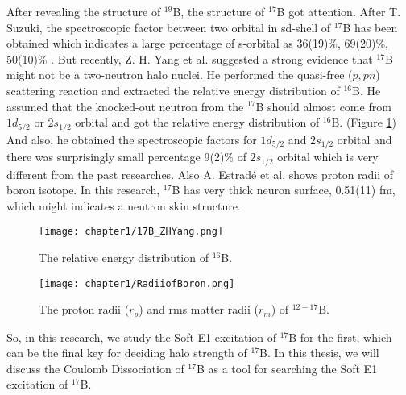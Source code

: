 After revealing the structure of $^{19}$B, the structure of $^{17}$B got attention. After T. Suzuki\cite{Suzuki99}, the spectroscopic factor between two orbital in sd-shell of $^{17}$B has been obtained which indicates a large percentage of s-orbital as 36(19)\%, 69(20)\%, 50(10)\% \cite{Suzuki99} \cite{Suzuki02} \cite{Yamaguchi}. But recently, Z. H. Yang et al. \cite{ZHYang} suggested a strong evidence that $^{17}$B might not be a two-neutron halo nuclei. He performed the quasi-free ($p,pn$) scattering reaction and extracted the relative energy distribution of $^{16}$B. He assumed that the knocked-out neutron from the $^{17}$B  should almost come from $1d_{5/2}$ or $2s_{1/2}$ orbital and got the relative energy distribution of $^{16}$B. (Figure \ref{fig:quasi-free}) And also, he obtained the spectroscopic factors for $1d_{5/2}$ and $2s_{1/2}$ orbital and there was surprisingly small percentage 9(2)\% of $2s_{1/2}$ orbital which is very different from the past researches. Also A. Estradé et al. \cite{Estrade} shows proton radii of boron isotope. In this research, $^{17}$B has very thick neuron surface, 0.51(11) fm, which might indicates a neutron skin structure. 

\begin{figure}
    \centering
    \texttt{[image: chapter1/17B\_ZHYang.png]}
    \caption{The relative energy distribution of $^{16}$B.\cite{ZHYang}}
    \label{fig:quasi-free}
\end{figure}

\begin{figure}
    \centering
    \texttt{[image: chapter1/RadiiofBoron.png]}
    \caption{The proton radii ($r_p$) and rms matter radii ($r_m$) of $^{12-17}$B. \cite{Estrade}}
\end{figure}

So, in this research, we study the Soft E1 excitation of $^{17}$B for the first, which can be the final key for deciding halo strength of $^{17}$B. In this thesis, we will discuss the Coulomb Dissociation of $^{17}$B as a tool for searching the Soft E1 excitation of $^{17}$B. 


